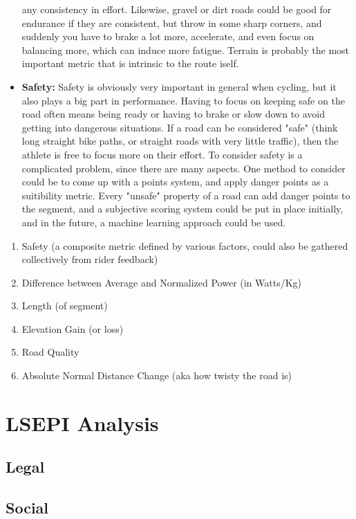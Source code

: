 \documentclass[11pt,twoside]{report}
\begin{document}
\begin{itemize}
	      any consistency in effort. Likewise, gravel or dirt roads could be good for endurance if they are consistent, but throw in some sharp corners, and suddenly you have to brake a lot more, accelerate,
	      and even focus on balancing more, which can induce more fatigue. Terrain is probably the most important metric that is intrinsic to the route iself.
	\item \textbf{Safety:} Safety is obviously very important in general when cycling, but it also plays a big part in performance. Having to focus on keeping safe on the road often means
	      being ready or having to brake or slow down to avoid getting into dangerous situations. If a road can be considered "safe" (think long straight bike paths, or straight roads with very little traffic), then
	      the athlete is free to focus more on their effort. To consider safety is a complicated problem, since there are many aspects. One method to consider could be to come up with a points system, and apply danger points
	      as a suitibility metric. Every "unsafe" property of a road can add danger points to the segment, and a subjective scoring system could be put in place initially, and in the future, a machine learning approach could be used.
\end{itemize}

\begin{enumerate}
	\item Safety (a composite metric defined by various factors, could also be gathered collectively from rider feedback)
	\item Difference between Average and Normalized Power (in Watts/Kg)
	\item Length (of segment)
	\item Elevation Gain (or loss)
	\item Road Quality
	\item Absolute Normal Distance Change (aka how twisty the road is)
\end{enumerate}

\section{LSEPI Analysis}
\subsection{Legal}
\subsection{Social}
\end{document}
